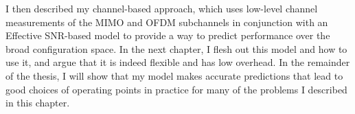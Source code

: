 I then described my channel-based approach, which uses low-level channel measurements of the MIMO and OFDM subchannels in conjunction with an Effective SNR-based model to provide a way to predict performance over the broad configuration space. In the next chapter, I flesh out this model and how to use it, and argue that it is indeed flexible and has low overhead. In the remainder of the thesis, I will show that my model makes accurate predictions that lead to good choices of operating points in practice for many of the problems I described in this chapter.

\ifx\mainfile\undefined

\fi

